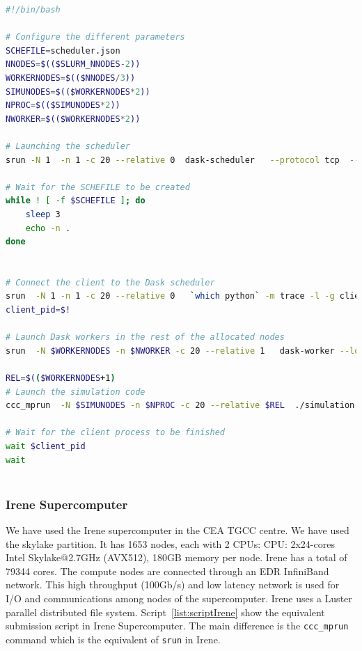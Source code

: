 \begin{lstlisting}[float, label=list:script, language=bash, caption=Submission script of simulation and in situ analytics in Ruche supercomputer]
#!/bin/bash

# Configure the different parameters 
SCHEFILE=scheduler.json
NNODES=$(($SLURM_NNODES-2))
WORKERNODES=$(($NNODES/3))
SIMUNODES=$(($WORKERNODES*2))
NPROC=$(($SIMUNODES*2))                   
NWORKER=$(($WORKERNODES*2))

# Launching the scheduler 
srun -N 1  -n 1 -c 20 --relative 0  dask-scheduler   --protocol tcp  --scheduler-file=$SCHEFILE 1>> scheduler.o  2>> scheduler.e  &

# Wait for the SCHEFILE to be created 
while ! [ -f $SCHEFILE ]; do
    sleep 3
    echo -n .
done


# Connect the client to the Dask scheduler
srun  -N 1 -n 1 -c 20 --relative 0   `which python` -m trace -l -g client.py 1>> client.o 2>> client.e &
client_pid=$!

# Launch Dask workers in the rest of the allocated nodes 
srun  -N $WORKERNODES -n $NWORKER -c 20 --relative 1   dask-worker --local-directory /tmp  --scheduler-file=${SCHEFILE} 1>> worker.o 2>>worker.e  &
     
REL=$(($WORKERNODES+1)
# Launch the simulation code
ccc_mprun  -N $SIMUNODES -n $NPROC -c 20 --relative $REL  ./simulation 1>> simulation.o 2>> simulation.e &

# Wait for the client process to be finished 
wait $client_pid
wait 
       
\end{lstlisting}

\subsubsection{Irene Supercomputer}

We have used the Irene supercomputer in the CEA TGCC centre. We have used the skylake partition. It has 1653 nodes, each with 2 CPUs: CPU: 2x24-cores Intel Skylake@2.7GHz (AVX512), 180GB memory per node. Irene has a total of 79344 cores.  The compute nodes are connected through an EDR InfiniBand network. This high throughput (100Gb/s) and low latency network is used for I/O and communications among nodes of the supercomputer. Irene uses a Luster parallel distributed file system. Script~\ref{list:scriptIrene} show the equivalent submission script in Irene Supercomputer. The main difference is the \texttt{ccc\_mprun} command which is the equivalent of \texttt{srun} in Irene.  

